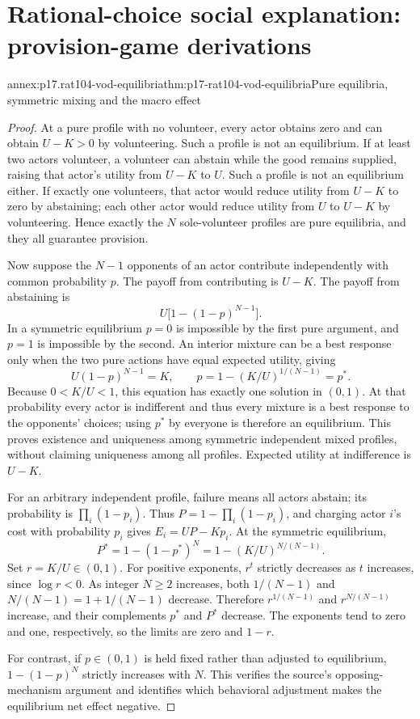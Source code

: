 \section{Rational-choice social explanation: provision-game derivations}
\label{annex:p17-rat104-provision-game}

\begin{annexitem}{annex:p17.rat104-vod-equilibria}{thm:p17-rat104-vod-equilibria}{Pure equilibria, symmetric mixing and the macro effect}
\begin{proof}
At a pure profile with no volunteer, every actor obtains zero and can
obtain \(U-K>0\) by volunteering. Such a profile is not an equilibrium.
If at least two actors volunteer, a volunteer can abstain while the good
remains supplied, raising that actor's utility from \(U-K\) to \(U\).
Such a profile is not an equilibrium either. If exactly one volunteers,
that actor would reduce utility from \(U-K\) to zero by abstaining;
each other actor would reduce utility from \(U\) to \(U-K\) by
volunteering. Hence exactly the \(N\) sole-volunteer profiles are pure
equilibria, and they all guarantee provision.

Now suppose the \(N-1\) opponents of an actor contribute independently
with common probability \(p\). The payoff from contributing is \(U-K\).
The payoff from abstaining is
\[
                   U\bigl[1-(1-p)^{N-1}\bigr].
\]
In a symmetric equilibrium \(p=0\) is impossible by the first pure
argument, and \(p=1\) is impossible by the second. An interior mixture
can be a best response only when the two pure actions have equal expected
utility, giving
\[
            U(1-p)^{N-1}=K,
\qquad p=1-(K/U)^{1/(N-1)}=p^*.
\]
Because \(0<K/U<1\), this equation has exactly one solution in
\((0,1)\). At that probability every actor is indifferent and thus
every mixture is a best response to the opponents' choices; using
\(p^*\) by everyone is therefore an equilibrium. This proves existence
and uniqueness among symmetric independent mixed profiles, without claiming
uniqueness among all profiles. Expected utility at indifference is \(U-K\).

For an arbitrary independent profile, failure means all actors abstain;
its probability is \(\prod_i(1-p_i)\). Thus
\(P=1-\prod_i(1-p_i)\), and charging actor \(i\)'s cost with
probability \(p_i\) gives \(E_i=UP-Kp_i\). At the symmetric equilibrium,
\[
 P^*=1-(1-p^*)^N=1-(K/U)^{N/(N-1)}.
\]
Set \(r=K/U\in(0,1)\). For positive exponents, \(r^t\) strictly
decreases as \(t\) increases, since \(\log r<0\). As integer
\(N\geq2\) increases, both \(1/(N-1)\) and
\(N/(N-1)=1+1/(N-1)\) decrease. Therefore
\(r^{1/(N-1)}\) and \(r^{N/(N-1)}\) increase, and their complements
\(p^*\) and \(P^*\) decrease. The exponents tend to zero and one,
respectively, so the limits are zero and \(1-r\).

For contrast, if \(p\in(0,1)\) is held fixed rather than adjusted
to equilibrium, \(1-(1-p)^N\) strictly increases with \(N\).
This verifies the source's opposing-mechanism argument and identifies
which behavioral adjustment makes the equilibrium net effect negative.
\end{proof}
\end{annexitem}

